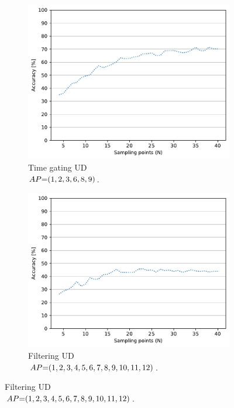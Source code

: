 \begin{figure}[ht]
  \begin{subfigure}{.49\textwidth}
    \centering
    \includegraphics[width=.99\linewidth]{Figures/RadarExperiments/Datasets/ThroughMaterials/Glass/samples-timegating-ud.pdf}
    \vspace{-15pt}
    \captionsetup{width=.99\linewidth}
    \caption{Time gating UD \\ $\splitatcommas{AP{=}(1, 2, 3, 6, 8, 9)}$.}
    \label{fig:radar-experiments:through-materials:glass-samples:timegating-ud}
  \end{subfigure}
  \begin{subfigure}{.49\textwidth}
    \centering
    \includegraphics[width=.99\linewidth]{Figures/RadarExperiments/Datasets/ThroughMaterials/Glass/samples-filtering-ud.pdf}  
    \vspace{-15pt}
    \captionsetup{width=.99\linewidth}
    \caption{Filtering UD \\ $\splitatcommas{AP{=}(1, 2, 3, 4, 5, 6, 7, 8, 9, 10, 11, 12)}$.}
    \label{fig:radar-experiments:through-materials:glass-samples:filtering-ud}
  \end{subfigure}


\end{figure}

